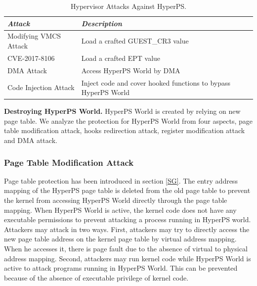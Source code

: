 \documentclass[conference]{IEEEtran}
\begin{document}
\begin{table}
\centering
\caption{Hypervisor Attacks Against HyperPS.}\label{tab3}
\begin{tabular}{p{2.8cm}|p{5.5cm}}
\hline
{\itshape\bfseries Attack} & {\itshape\bfseries Description} \\
\hline
Modifying VMCS Attack & Load a crafted GUEST\_CR3 value\\
\hline
CVE-2017-8106 & Load a crafted EPT value \\
\hline
DMA Attack & Access HyperPS World by DMA \\
\hline
Code Injection Attack & Inject code and cover hooked functions to bypass HyperPS World \\
\hline
\end{tabular}
\end{table}

\textbf{Destroying HyperPS World.}
HyperPS World is created by relying on new page table.
We analyze the protection for HyperPS World from four aspects, page table modification attack, hooks redirection attack, register modification attack and DMA attack.


\subsubsection{Page Table Modification Attack}

Page table protection has been introduced in section \ref{SG}. The entry address mapping of the HyperPS page table is deleted from the old page table to prevent the kernel from accessing HyperPS World directly through the page table mapping. 
When HyperPS World is active, the kernel code does not have any executable permissions to prevent attacking a  process running in HyperPS world.
Attackers may attack in two ways.
First, attackers may try to directly access the new page table address on the kernel page table by virtual address mapping. When he accesses it, there is page fault due to the absence of virtual to physical address mapping.
Second, attackers may run kernel code while HyperPS World is active to attack programs running in HyperPS World. This can be prevented because of the absence of executable privilege of kernel code.
\end{document}
